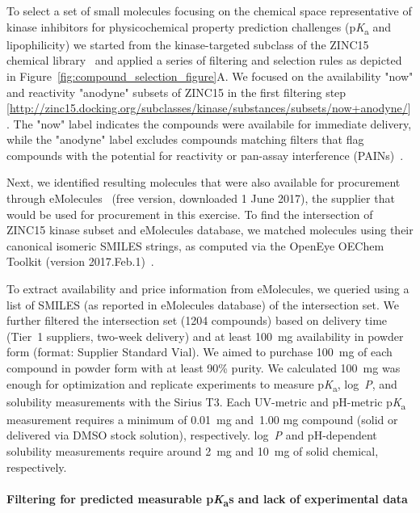 \documentclass[9pt,lineno]{elife}
\newcommand{\pKa}{p\textit{K}\textsubscript{a}}
\newcommand{\logP}{log~\textit{P}}
\begin{document}
To select a set of small molecules focusing on the chemical space representative of kinase inhibitors for physicochemical property prediction challenges (\pKa{} and lipophilicity) we started from the kinase-targeted subclass of the ZINC15 chemical library~\citep{sterling_zinc_2015} and applied a series of filtering and selection rules as depicted in Figure~\ref{fig:compound_selection_figure}A. 
We focused on the availability "now" and reactivity "anodyne" subsets of ZINC15 in the first filtering step [\url{http://zinc15.docking.org/subclasses/kinase/substances/subsets/now+anodyne/}]. 
The "now" label indicates the compounds were availabile for immediate delivery, while the "anodyne" label excludes compounds matching filters that flag compounds with the potential for reactivity or pan-assay interference (PAINs)~\citep{baell_new_2010, saubern_knime_2011}. 

Next, we identified resulting molecules that were also available for procurement through eMolecules~\citep{eMolecules_ref_2017} (free version, downloaded 1 June 2017), the supplier that would be used for procurement in this exercise. 
To find the intersection of ZINC15 kinase subset and eMolecules database, we matched molecules using their canonical isomeric SMILES strings, as computed via the OpenEye OEChem Toolkit (version 2017.Feb.1)~\citep{oechem_openeye_2017}.

To extract availability and price information from eMolecules, we queried using a list of SMILES (as reported in eMolecules database) of the intersection set. 
We further filtered the intersection set (1204 compounds) based on delivery time (Tier~1 suppliers, two-week delivery) and at least 100~mg availability in powder form (format: Supplier Standard Vial).  
We aimed to purchase 100~mg of each compound in powder form with at least 90\% purity. We calculated 100~mg was enough for optimization and replicate experiments to measure \pKa{}, \logP{}, and solubility measurements with the Sirius T3. 
Each UV-metric and pH-metric \pKa{} measurement requires a minimum of 0.01~mg and~1.00 mg compound (solid or delivered via DMSO stock solution), respectively. 
\logP{} and pH-dependent solubility measurements require around 2~mg and 10~mg of solid chemical, respectively. 

\paragraph{Filtering for predicted measurable \pKa{}s and lack of experimental data}
\end{document}
